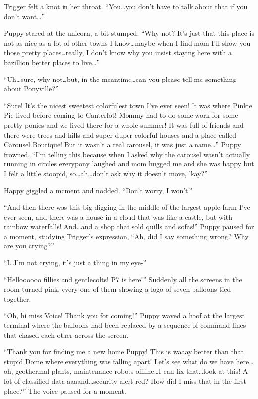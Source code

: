 Trigger felt a knot in her throat. ``You\dots you don't have to talk about that if you don't want\dots''

Puppy stared at the unicorn, a bit stumped. ``Why not? It's just that this place is not as nice as a lot of other towns I know\dots maybe when I find mom I'll show you those pretty places\dots really, I don't know why you insist staying here with a bazillion better places to live\dots''

``Uh\dots sure, why not\dots but, in the meantime\dots can you please tell me something about Ponyville?''

``Sure! It's the nicest sweetest colorfulest town I've ever seen! It was where Pinkie Pie lived before coming to Canterlot! Mommy had to do some work for some pretty ponies and we lived there for a whole summer! It was full of friends and there were trees and hills and super duper colorful houses and a place called Carousel Boutique! But it wasn't a real carousel, it was just a name\dots'' Puppy frowned, ``I'm telling this because when I asked why the carousel wasn't actually running in circles everypony laughed and mom hugged me and she was happy but I felt a little stoopid, so\dots ah\dots don't ask why it doesn't move, 'kay?''

Happy giggled a moment and nodded. ``Don't worry, I won't.''

``And then there was this big digging in the middle of the largest apple farm I've ever seen, and there was a house in a cloud that was like a castle, but with rainbow waterfalls! And\dots and a shop that sold quills and sofas!'' Puppy paused for a moment, studying Trigger's expression, ``Ah, did I say something wrong? Why are you crying?''

``I\dots I'm not crying, it's just a thing in my eye-''

``Helloooooo fillies and gentlecolts! P7 is here!'' Suddenly all the screens in the room turned pink, every one of them showing a logo of seven balloons tied together.

``Oh, hi miss Voice! Thank you for coming!'' Puppy waved a hoof at the largest terminal where the balloons had been replaced by a sequence of command lines that chased each other across the screen.

``Thank you for finding me a new home Puppy! This is waaay better than that stupid Dome where everything was falling apart! Let's see what do we have here\dots oh, geothermal plants, maintenance robots offline\dots I can fix that\dots look at this! A lot of classified data aaaand\dots security alert red? How did I miss that in the first place?'' The voice paused for a moment.

